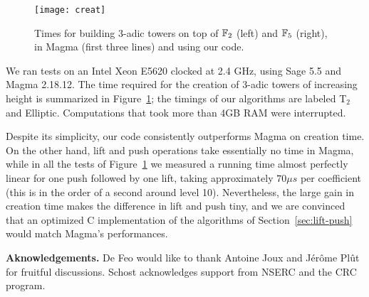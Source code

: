 \documentclass{sig-alternate}
\begin{document}
\begin{figure}
  \centering
  \texttt{[image: creat]}
  \caption{Times for building $3$-adic towers on top of $\mathbb{F}_2$ (left)
    and $\mathbb{F}_5$ (right), in Magma (first three lines) and using our
    code.}
  \label{fig:build}
\end{figure}

We ran tests on an Intel Xeon E5620 clocked at 2.4 GHz, using Sage 5.5
and Magma 2.18.12. The time required for the creation of $3$-adic
towers of increasing height is summarized in
Figure~\ref{fig:build}; the timings of our algorithms are labeled 
T$_2$ and Elliptic. Computations that took more than 4GB RAM were
interrupted.

Despite its simplicity, our code consistently outperforms Magma on
creation time. On the other hand, lift and push operations take
essentially no time in Magma, while in all the tests of
Figure~\ref{fig:build} we measured a running time almost perfectly
linear for one push followed by one lift, taking approximately $70\mu
s$ per coefficient (this is in the order of a second around level
10). Nevertheless, the large gain in creation time makes the
difference in lift and push tiny, and we are convinced that an
optimized C implementation of the algorithms of
Section~\ref{sec:lift-push} would match Magma's performances.


\bigskip\noindent \textbf{Aknowledgements.}  De Feo would like to thank Antoine
Joux and J\'er\^ome Pl\^ut for fruitful discussions. Schost acknowledges
support from NSERC and the CRC program.

\scriptsize


\end{document}
